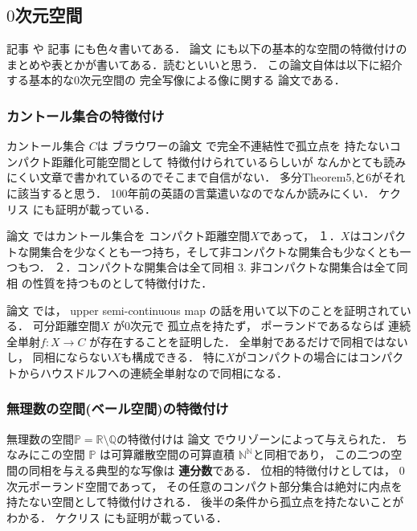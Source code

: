 \documentclass[leqno, a4paper, 12pt]{jsarticle}
\newcommand{\nn}{\mathbb{N}}
\newcommand{\qq}{\mathbb{Q}}
\newcommand{\pp}{\mathbb{P}}
\newcommand{\rr}{\mathbb{R}}
\begin{document}
\subsection{$0$次元空間}

記事
\cite{van2003topological}
や
記事
\cite{isolated2005}
にも色々書いてある．
論文
\cite{MR0657649}
にも以下の基本的な空間の特徴付けのまとめや表とかが書いてある．読むといいと思う．
この論文自体は以下に紹介する基本的な0次元空間の
完全写像による像に関する
論文である．

\subsubsection{カントール集合の特徴付け}
カントール集合
$C$は
ブラウワーの論文
\cite{brouwer1910structure}
で完全不連結性で孤立点を
持たないコンパクト距離化可能空間として
特徴付けられているらしいが
なんかとても読みにくい文章で書かれているのでそこまで自信がない．
多分Theorem5,と6がそれに該当すると思う．
100年前の英語の言葉遣いなのでなんか読みにくい．
ケクリス
\cite{MR1321597}
にも証明が載っている．

論文
\cite{MR0377836}
ではカントール集合を
コンパクト距離空間$X$であって，
１．$X$はコンパクトな開集合を少なくとも一つ持ち，そして非コンパクトな開集合も少なくとも一つもつ．
２．コンパクトな開集合は全て同相
3. 非コンパクトな開集合は全て同相
の性質を持つものとして特徴付けた．

論文
\cite{MR0139142}
では，
upper semi-continuous map
の話を用いて以下のことを証明されている．
可分距離空間$X$
が0次元で
孤立点を持たず，
ポーランドであるならば
連続全単射$f\colon X\to C$
が存在することを証明した．
全単射であるだけで同相ではないし，
同相にならない$X$も構成できる．
特に$X$がコンパクトの場合にはコンパクトからハウスドルフへの連続全単射なので同相になる．

\subsubsection{無理数の空間(ベール空間)の特徴付け}
無理数の空間$\pp=\rr \setminus \qq$の特徴付けは
論文
\cite{MR1512393}
でウリゾーンによって与えられた．
ちなみにこの空間
$\pp$
は可算離散空間の可算直積
$\nn^{\nn}$と同相であり，
この二つの空間の同相を与える典型的な写像は
\textbf{連分数}である．
位相的特徴付けとしては，
$0$次元ポーランド空間であって，
その任意のコンパクト部分集合は絶対に内点を持たない空間として特徴付けされる．
後半の条件から孤立点を持たないことがわかる．
ケクリス
\cite{MR1321597}
にも証明が載っている．
\end{document}
